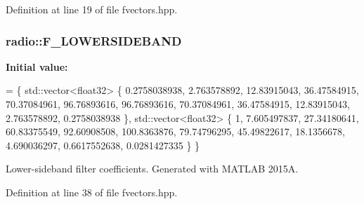 Definition at line 19 of file fvectors.\+hpp.

\hypertarget{namespaceradio_a0ffd57d5a11ff70a1f55dbdc8ebe098d}{
\subsubsection[{F\+\_\+\+L\+O\+W\+E\+R\+S\+I\+D\+E\+B\+A\+N\+D}]{ radio\+::\+F\+\_\+\+L\+O\+W\+E\+R\+S\+I\+D\+E\+B\+A\+N\+D}}\label{namespaceradio_a0ffd57d5a11ff70a1f55dbdc8ebe098d}
{\bfseries Initial value\+:}
\begin{DoxyCode}
= \{ std::vector<float32> \{
        0.2758038938,
            2.763578892,
            12.83915043,
            36.47584915,
            70.37084961,
            96.76893616,
            96.76893616,
            70.37084961,
            36.47584915,
            12.83915043,
            2.763578892,
            0.2758038938
    \}, std::vector<float32> \{
        1,
            7.605497837,
            27.34180641,
            60.83375549,
            92.60908508,
            100.8363876,
            79.74796295,
            45.49822617,
            18.1356678,
            4.690036297,
            0.6617552638,
            0.0281427335      
    \} \}
\end{DoxyCode}
Lower-\/sideband filter coefficients. Generated with M\+A\+T\+L\+A\+B 2015\+A. 

Definition at line 38 of file fvectors.\+hpp.

